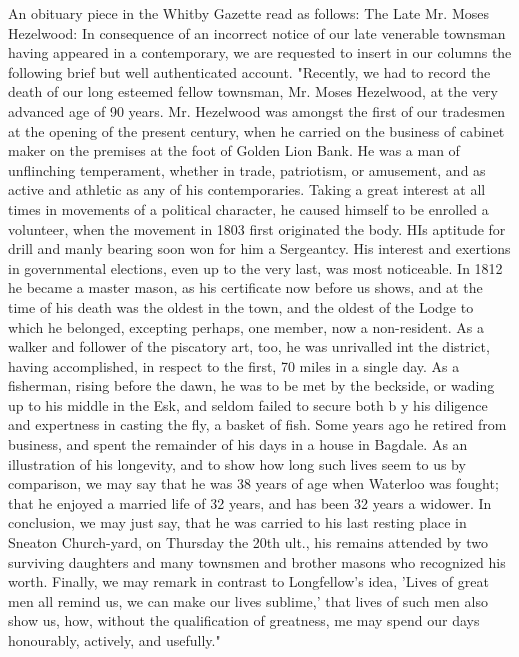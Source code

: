 An obituary piece in the Whitby Gazette read as follows:
The Late Mr. Moses Hezelwood:
In consequence of an incorrect notice of our late venerable townsman having appeared in a contemporary, we are requested to insert in our columns the following brief but well authenticated account.
"Recently, we had to record the death of our long esteemed fellow townsman, Mr. Moses Hezelwood, at the very advanced age of 90 years. Mr. Hezelwood was amongst the first of our tradesmen at the opening of the present century, when he carried on the business of cabinet maker on the premises at the foot of Golden Lion Bank. He was a man of unflinching temperament, whether in trade, patriotism, or amusement, and as active and athletic as any of his contemporaries. Taking a great interest at all times in movements of a political character, he caused himself to be enrolled a volunteer, when the movement in 1803 first originated the body. HIs aptitude for drill and manly bearing soon won for him a Sergeantcy. His interest and exertions in governmental elections, even up to the very last, was most noticeable. In 1812 he became a master mason, as his certificate now before us shows, and at the time of his death was the oldest in the town, and the oldest of the Lodge to which he belonged, excepting perhaps, one member, now a non-resident. As a walker and follower of the piscatory art, too, he was unrivalled int the district, having accomplished, in respect to the first, 70 miles in a single day. As a fisherman, rising before the dawn, he was to be met by the beckside, or wading up to his middle in the Esk, and seldom failed to secure both b y his diligence and expertness in casting the fly, a basket of fish. Some years ago he retired from business, and spent the remainder of his days in a house in Bagdale. As an illustration of his longevity, and to show how long such lives seem to us by comparison, we may say that he was 38 years of age when Waterloo was fought; that he enjoyed a married life of 32 years, and has been 32 years a widower. In conclusion, we may just say, that he was carried to his last resting place in Sneaton Church-yard, on Thursday the 20th ult., his remains attended by two surviving daughters and many townsmen and brother masons who recognized his worth. Finally, we may remark in contrast to Longfellow's idea, 'Lives of great men all remind us, we can make our lives sublime,' that lives of such men also show us, how, without the qualification of greatness, me may spend our days honourably, actively, and usefully." \cite{MHezelwoodDeathnotice}
